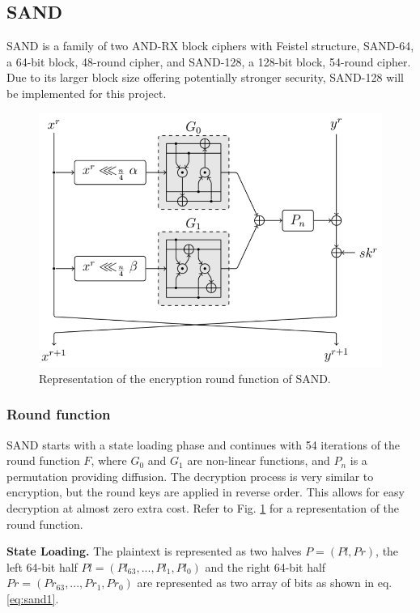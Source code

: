 \documentclass[conference]{IEEEtran}
\begin{document}
\subsection{SAND}

SAND is a family of two AND-RX block ciphers with Feistel structure, SAND-64, a 64-bit block, 48-round cipher, and SAND-128, a 128-bit block, 54-round cipher. Due to its larger block size offering potentially stronger security, SAND-128 will be implemented for this project\cite{SAND}.

\begin{figure}
  \centering
  \includegraphics[width=0.9\columnwidth]{figures/SAND01.png}
  \caption{Representation of the encryption round function of SAND\cite{SAND}.}
  \label{fig:SAND01}
\end{figure}

\subsubsection{Round function}
SAND starts with a state loading phase and continues with 54 iterations of the round function $F$, where $G_0$ and $G_1$ are non-linear functions, and $P_n$ is a permutation providing diffusion. The decryption process is very similar to encryption, but the round keys are applied in reverse order. This allows for easy decryption at almost zero extra cost. Refer to Fig. \ref{fig:SAND01} for a representation of the round function.

\textbf{State Loading.} The plaintext is represented as two halves $P = (Pl,Pr)$, the left 64-bit half $Pl = (Pl_{63},...,Pl_1,Pl_0)$ and the right 64-bit half $Pr = (Pr_{63},...,Pr_1,Pr_0)$ are represented as two array of bits as shown in eq. \ref{eq:sand1}.
\end{document}
